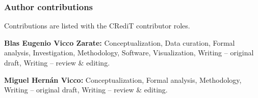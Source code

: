 \subsubsection*{Author contributions}

Contributions are listed with the CRediT contributor roles.

\noindent\textbf{Blas Eugenio Vicco Zarate:} Conceptualization, Data curation, Formal analysis, Investigation, Methodology, Software, Visualization, Writing -- original draft, Writing -- review \& editing.

\noindent\textbf{Miguel Hern\'an Vicco:} Conceptualization, Formal analysis, Methodology, Writing -- original draft, Writing -- review \& editing.
